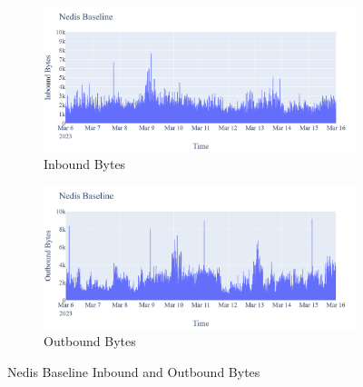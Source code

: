 \begin{figure}[H]
    \centering
    \begin{subfigure}[b]{0.7\textwidth}
        \includegraphics[width=\textwidth]{figures/Nedis_Baseline_InboundBytes.png}
        \caption{Inbound Bytes}
        \label{fig:NedisBaselineInboundBytes}
    \end{subfigure}
    \begin{subfigure}[b]{0.7\textwidth}
        \includegraphics[width=\textwidth]{figures/Nedis_Baseline_OutboundBytes.png}
        \caption{Outbound Bytes}
        \label{fig:NedisBaselineOutboundBytes}
    \end{subfigure}
    \caption{Nedis Baseline Inbound and Outbound Bytes}
    \label{Fig:NedisBaselineOutandInboundBytes}
 \end{figure}

